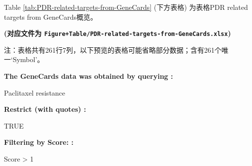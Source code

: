 \documentclass[
]{article}
\begin{document}
\begin{center}\vspace{1.5cm}\end{center}

Table \ref{tab:PDR-related-targets-from-GeneCards} (下方表格) 为表格PDR related targets from GeneCards概览。

\textbf{(对应文件为 \texttt{Figure+Table/PDR-related-targets-from-GeneCards.xlsx})}

\begin{center}\begin{tcolorbox}[colback=gray!10, colframe=gray!50, width=0.9\linewidth, arc=1mm, boxrule=0.5pt]注：表格共有261行7列，以下预览的表格可能省略部分数据；含有261个唯一`Symbol'。
\end{tcolorbox}
\end{center}\begin{center}\begin{tcolorbox}[colback=gray!10, colframe=gray!50, width=0.9\linewidth, arc=1mm, boxrule=0.5pt]
\textbf{
The GeneCards data was obtained by querying
:}

\vspace{0.5em}

    Paclitaxel resistance

\vspace{2em}


\textbf{
Restrict (with quotes)
:}

\vspace{0.5em}

    TRUE

\vspace{2em}


\textbf{
Filtering by Score:
:}

\vspace{0.5em}

    Score > 1

\vspace{2em}
\end{tcolorbox}
\end{center}
\end{document}
